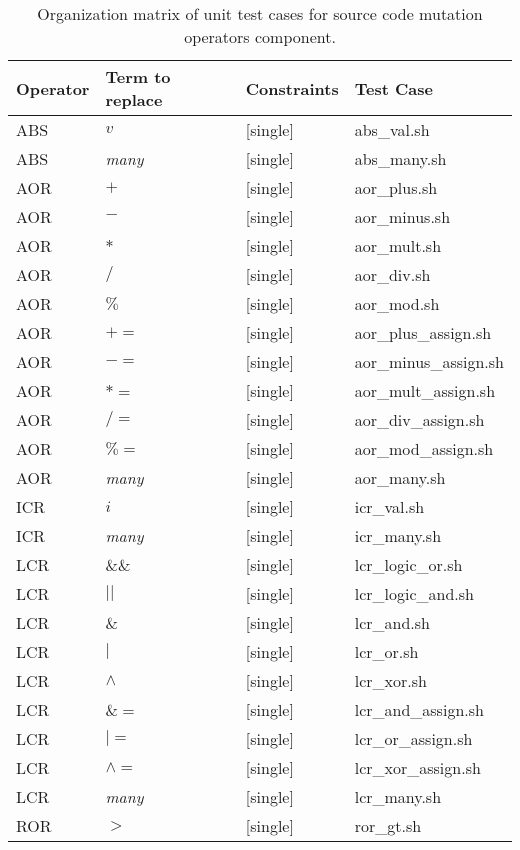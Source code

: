 
\begin{table}[h]
\scriptsize
\centering
\caption{Organization matrix of unit test cases for source code mutation operators component.}
\label{table:operators:categories}

\begin{tabular}{|llll|}
\hline 
\textbf{Operator}	&	\textbf{Term to replace}	&	\textbf{Constraints}	&	\textbf{Test Case} \\
\hline 
ABS	&	$v$	&	[single]	&	abs\_val.sh \\
ABS	&	\textit{many}	&	[single]	&	abs\_many.sh \\
AOR	&	$+$	&	[single]	&	aor\_plus.sh \\
AOR	&	$-$	&	[single]	&	aor\_minus.sh \\
AOR	&	$*$	&	[single]	&	aor\_mult.sh \\
AOR	&	$/$	&	[single]	&	aor\_div.sh \\
AOR	&	$\%$	&	[single]	&	aor\_mod.sh \\
AOR	&	$+=$	&	[single]	&	aor\_plus\_assign.sh \\
AOR	&	$-=$	&	[single]	&	aor\_minus\_assign.sh \\
AOR	&	$*=$	&	[single]	&	aor\_mult\_assign.sh \\
AOR	&	$/=$	&	[single]	&	aor\_div\_assign.sh \\
AOR	&	$\%=$	&	[single]	&	aor\_mod\_assign.sh \\
AOR	&	\textit{many}	&	[single]	&	aor\_many.sh \\
ICR	&	$i$	&	[single]	&	icr\_val.sh \\
ICR	&	\textit{many}	&	[single]	&	icr\_many.sh \\
LCR	&	$\&\&$	&	[single]	&	lcr\_logic\_or.sh \\
LCR	&	$||$	&	[single]	&	lcr\_logic\_and.sh \\
LCR	&	$\&$	&	[single]	&	lcr\_and.sh \\
LCR	&	$|$	&	[single]	&	lcr\_or.sh \\
LCR	&	$\land$	&	[single]	&	lcr\_xor.sh \\
LCR	&	$\&=$	&	[single]	&	lcr\_and\_assign.sh \\
LCR	&	$|=$	&	[single]	&	lcr\_or\_assign.sh \\
LCR	&	$\land=$	&	[single]	&	lcr\_xor\_assign.sh \\
LCR	&	\textit{many}&	[single]	&	lcr\_many.sh \\
ROR	&	$>$	&	[single]	&	ror\_gt.sh \\

\end{tabular}
\end{table}
